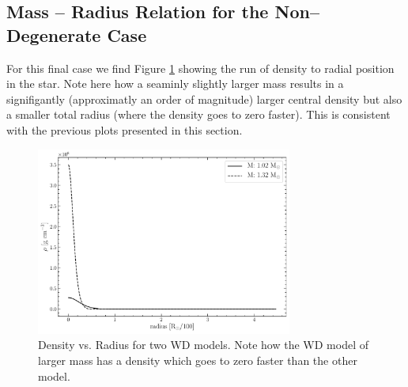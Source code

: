 \subsection{Mass -- Radius Relation for the Non--Degenerate Case}
For this final case we find Figure \ref{fig:TwoWDMass} showing the run of density to radial position in the star. Note here how a seaminly slightly larger mass results in a signifigantly (approximatly an order of magnitude) larger central density but also a smaller total radius (where the density goes to zero faster). This is consistent with the previous plots presented in this section.
\begin{figure}[ht!]
    \centering
    \includegraphics[width=0.75\textwidth]{Graphics/WDMass1_13.pdf}
    \caption{Density vs. Radius for two WD models. Note how the WD model of larger mass has a density which goes to zero faster than the other model.}
    \label{fig:TwoWDMass}
\end{figure}

% 
% 


